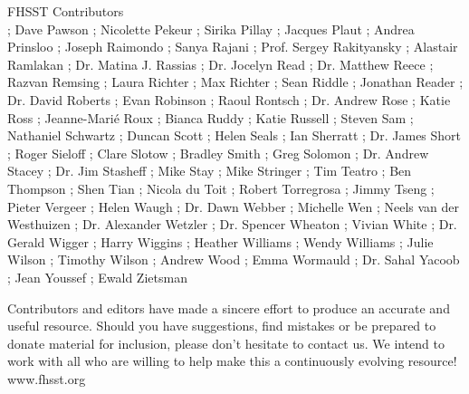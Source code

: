 \begin{center}{\Large FHSST Contributors\\}
; Dave Pawson
; Nicolette Pekeur
; Sirika Pillay
; Jacques Plaut
; Andrea Prinsloo
; Joseph Raimondo
; Sanya Rajani
; Prof. Sergey Rakityansky
; Alastair Ramlakan
; Dr. Matina J. Rassias
; Dr. Jocelyn Read
; Dr. Matthew Reece
; Razvan Remsing
; Laura Richter
; Max Richter
; Sean Riddle
; Jonathan Reader
; Dr. David Roberts
; Evan Robinson
; Raoul Rontsch
; Dr. Andrew  Rose
; Katie Ross
; Jeanne-Mari\'{e} Roux
; Bianca Ruddy
; Katie Russell
; Steven Sam
; Nathaniel Schwartz
; Duncan Scott
; Helen Seals
; Ian Sherratt
; Dr. James Short
; Roger Sieloff
; Clare Slotow
; Bradley  Smith
; Greg Solomon
; Dr. Andrew Stacey
; Dr. Jim Stasheff
; Mike Stay
; Mike Stringer
; Tim Teatro
; Ben Thompson
; Shen Tian
; Nicola du Toit
; Robert Torregrosa
; Jimmy Tseng
; Pieter Vergeer
; Helen Waugh
; Dr. Dawn Webber
; Michelle Wen
; Neels van der Westhuizen
; Dr. Alexander Wetzler
; Dr. Spencer Wheaton
; Vivian White
; Dr. Gerald Wigger
; Harry Wiggins 
; Heather Williams
; Wendy Williams
; Julie Wilson
; Timothy Wilson
; Andrew Wood
; Emma Wormauld
; Dr. Sahal Yacoob
; Jean Youssef
; Ewald Zietsman
\end{center}
\singlespacing
\begin{center}
Contributors and editors have made a sincere effort to produce an accurate and useful resource. Should you have suggestions, find mistakes or be prepared to donate material for inclusion, please don't hesitate to contact us. We intend to work with all who are willing to help make this a continuously evolving resource!\\
\vspace{2cm}
{\Large www.fhsst.org}
\end{center}

